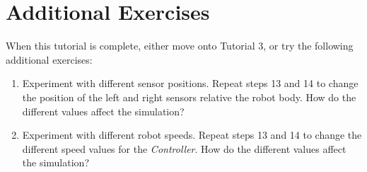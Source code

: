 \documentclass[11pt,a4paper]{../tutorial}
\begin{document}
\section{Additional Exercises}

When this tutorial is complete, either move onto Tutorial 3, or try the following additional exercises:

\begin{enumerate}
  \item Experiment with different sensor positions. Repeat steps 13 and 14 to change the position of the left and right sensors relative the robot body. How do the different values affect the simulation?
  \item Experiment with different robot speeds. Repeat steps 13 and 14 to change the different speed values for the \emph{Controller}. How do the different values affect the simulation?
\end{enumerate}
\end{document}

